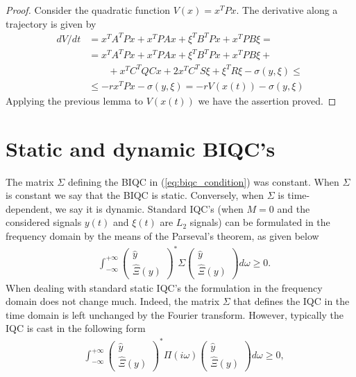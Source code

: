 \documentclass[letterpaper,10pt,conference,twocolumn]{IEEEtran}
\newcommand{\w}{\omega}
\newcommand{\Csi}{\Xi}
\begin{document}
\begin{proof}
	Consider the quadratic function $V(x)=x^TPx$.
	The derivative along a trajectory is given by
	\begin{align*}
		dV/dt&=x^TA^TPx+x^TPAx+\xi^T B^T Px + x^T P B\xi=\\
			&=x^TA^TPx+x^TPAx+\xi^T B^T Px + x^T P B\xi+\\
			&\qquad +x^TC^TQCx+2x^TC^TS\xi+\xi^TR\xi-\sigma(y,\xi)\leq\\
			&\leq -r x^TPx -\sigma(y,\xi) = -r V(x(t)) -\sigma(y,\xi)
	\end{align*}
	Applying the previous lemma to $V(x(t))$ we have the assertion proved.
\end{proof}


\section{Static and dynamic BIQC's}\label{sec:static and dynamic BIQC}
The matrix $\Sigma$ defining the BIQC in (\ref{eq:biqc_condition}) was constant. When $\Sigma$ is constant
we say that the BIQC is static. Conversely, when $\Sigma$ is time-dependent, we say
it is dynamic.
Standard IQC's (when $M=0$ and the considered signals $y(t)$ and $\xi(t)$ are $L_2$ signals) can be formulated in the frequency domain by the means of the Parseval's theorem, as given below
\begin{align}\nonumber
	& \int_{-\infty}^{+\infty}
		\left(\begin{array}{c}
			\hat y\\
			\hat{\Csi}(y)
		\end{array}\right)^*
		\Sigma
		\left(\begin{array}{c}
			\hat y\\
			\hat{\Csi}(y)
		\end{array}\right)
	d\w \geq 0.
\end{align}
When dealing with standard static IQC's the formulation in the frequency domain does not
change much. Indeed, the matrix $\Sigma$ that defines the IQC in
the time domain is left unchanged by the Fourier transform.
However, typically the IQC is cast in the following form
\begin{align*}
	& \int_{-\infty}^{+\infty}
		\left(\begin{array}{c}
			\hat y\\
			\hat{\Csi}(y)
		\end{array}\right)^*
		\Pi(i\w)
		\left(\begin{array}{c}
			\hat y\\
			\hat{\Csi}(y)
		\end{array}\right)
	d\w \geq 0,
\end{align*}
\end{document}
